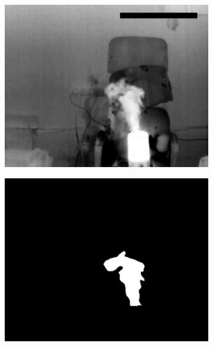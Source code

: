 \documentclass[14pt, a4paper]{extreport}
\begin{document}
\begin{figure}[h!]
\begin{subfigure}{.32\textwidth}
			\includegraphics[width = \textwidth]{image/chapter_3/examples/tep/185}
		\end{subfigure}
		\begin{subfigure}{.32\textwidth}
			\centering
			\includegraphics[width = \textwidth]{image/chapter_3/examples/mask_razmet/185}
		\end{subfigure}
		\begin{subfigure}{.32\textwidth}
			\centering

\end{subfigure}
\end{figure}
\end{document}
